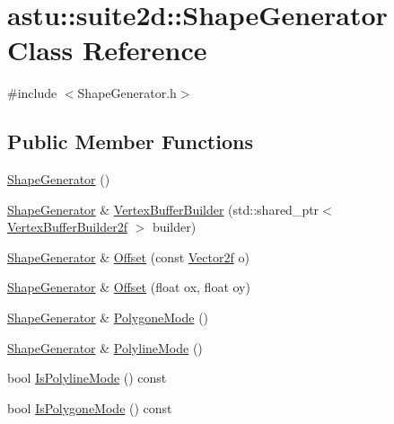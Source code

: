 \hypertarget{classastu_1_1suite2d_1_1ShapeGenerator}{}\section{astu\+:\+:suite2d\+:\+:Shape\+Generator Class Reference}
\label{classastu_1_1suite2d_1_1ShapeGenerator}


{\ttfamily \#include $<$Shape\+Generator.\+h$>$}

\subsection*{Public Member Functions}
\begin{DoxyCompactItemize}
\item 
\hyperlink{classastu_1_1suite2d_1_1ShapeGenerator_a56c9de00ce73e09b63a122fa34561490}{Shape\+Generator} ()
\item 
\hyperlink{classastu_1_1suite2d_1_1ShapeGenerator}{Shape\+Generator} \& \hyperlink{classastu_1_1suite2d_1_1ShapeGenerator_abbc75734a94b70f5be3db4cc1829494a}{Vertex\+Buffer\+Builder} (std\+::shared\+\_\+ptr$<$ \hyperlink{group__gfx__group_ga45033e159deced790d4dc3968ad8e878}{Vertex\+Buffer\+Builder2f} $>$ builder)
\item 
\hyperlink{classastu_1_1suite2d_1_1ShapeGenerator}{Shape\+Generator} \& \hyperlink{classastu_1_1suite2d_1_1ShapeGenerator_aafbe132e9fa8b459377e34fc384db6ae}{Offset} (const \hyperlink{classastu_1_1Vector2}{Vector2f} o)
\item 
\hyperlink{classastu_1_1suite2d_1_1ShapeGenerator}{Shape\+Generator} \& \hyperlink{classastu_1_1suite2d_1_1ShapeGenerator_a9d9b5606c488f7179349ead083e79a7d}{Offset} (float ox, float oy)
\item 
\hyperlink{classastu_1_1suite2d_1_1ShapeGenerator}{Shape\+Generator} \& \hyperlink{classastu_1_1suite2d_1_1ShapeGenerator_a86ebc573fad6a23691c62f0a34a6ba87}{Polygone\+Mode} ()
\item 
\hyperlink{classastu_1_1suite2d_1_1ShapeGenerator}{Shape\+Generator} \& \hyperlink{classastu_1_1suite2d_1_1ShapeGenerator_a7e1aa918a8a81b9e55c9d784ee6d38e8}{Polyline\+Mode} ()
\item 
bool \hyperlink{classastu_1_1suite2d_1_1ShapeGenerator_a6dd93b603ec632e6ff800bc1fcd223a9}{Is\+Polyline\+Mode} () const
\item 
bool \hyperlink{classastu_1_1suite2d_1_1ShapeGenerator_a3cb3a9b392451d077d1c670347bb4b93}{Is\+Polygone\+Mode} () const
\item 

\end{DoxyCompactItemize}
